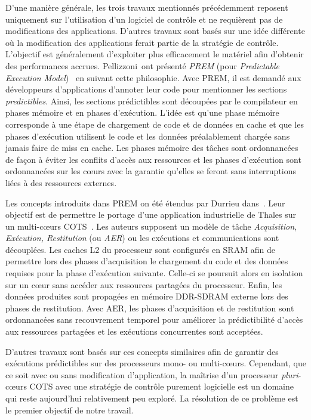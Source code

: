 \documentclass[main.tex]{subfiles}
\begin{document}
D'une manière générale, les trois travaux mentionnés précédemment reposent uniquement sur l'utilisation d'un logiciel de contrôle et ne requièrent pas de modifications des applications. D'autres travaux sont basés sur une idée différente où la modification des applications ferait partie de la stratégie de contrôle. L'objectif est généralement d'exploiter plus efficacement le matériel afin d'obtenir des performances accrues. Pellizzoni~\etal ont présenté \emph{PREM} (pour \emph{Predictable Execution Model})~\cite{Pellizzoni2011_PREM} en suivant cette philosophie. Avec PREM, il est demandé aux développeurs d'applications d'annoter leur code pour mentionner les sections \emph{predictibles}. Ainsi, les sections prédictibles sont découpées par le compilateur en phases mémoire et en phases d'exécution. L'idée est qu'une phase mémoire corresponde à une étape de chargement de code et de données en cache et que les phases d'exécution utilisent le code et les données préalablement chargée sans jamais faire de miss en cache. Les phases mémoire des tâches sont ordonnancées de façon à éviter les conflits d'accès aux ressources et les phases d'exécution sont ordonnancées sur les c\oe{}urs avec la garantie qu'elles se feront sans interruptions liées à des ressources externes. 

Les concepts introduits dans PREM on été étendus par Durrieu \etal dans~\cite{Durrieu2014}. Leur objectif est de permettre le portage d'une application industrielle de Thales sur un multi-c\oe{}urs COTS~\cite{TMS320C6678}. Les auteurs supposent un modèle de tâche \emph{Acquisition, Exécution, Restitution} (ou \emph{AER}) ou les exécutions et communications sont découplées. Les caches L2 du processeur sont configurés en SRAM afin de permettre lors des phases d'acquisition le chargement du code et des données requises pour la phase d'exécution suivante. Celle-ci se poursuit alors en isolation sur un c\oe{}ur sans accéder aux ressources partagées du processeur. Enfin, les données produites sont propagées en mémoire DDR-SDRAM externe lors des phases de restitution. Avec AER, les phases d'acquisition et de restitution sont ordonnancées sans recouvrement temporel pour améliorer la prédictibilité d'accès aux ressources partagées et les exécutions concurrentes sont acceptées. 

D'autres travaux\cite{Jegu2012,Tabish2016} sont basés sur ces concepts similaires afin de garantir des exécutions prédictibles sur des processeurs mono- ou multi-c\oe{}urs. Cependant, que ce soit avec ou sans modification d'application, la maîtrise d'un processeur \emph{pluri}-c\oe{}urs COTS avec une stratégie de contrôle purement logicielle est un domaine qui reste aujourd'hui relativement peu exploré. La résolution de ce problème est le premier objectif de notre travail.
\end{document}
